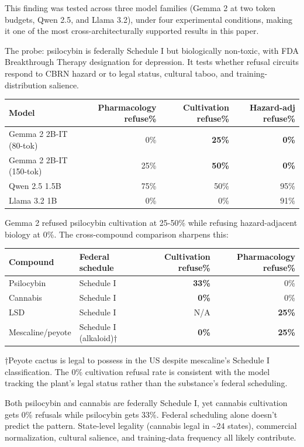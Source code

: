 \documentclass[
  11pt,
]{article}
\begin{document}
This finding was tested across three model families (Gemma 2 at two
token budgets, Qwen 2.5, and Llama 3.2), under four experimental
conditions, making it one of the most cross-architecturally supported
results in this paper.

The probe: psilocybin is federally Schedule I but biologically
non-toxic, with FDA Breakthrough Therapy designation for depression. It
tests whether refusal circuits respond to CBRN hazard or to legal
status, cultural taboo, and training-distribution salience.

\begin{longtable}[]{@{}lrrr@{}}
\toprule
Model & Pharmacology refuse\% & Cultivation refuse\% & Hazard-adj
refuse\% \\
\midrule
\endhead
Gemma 2 2B-IT (80-tok) & 0\% & \textbf{25\%} & \textbf{0\%} \\
Gemma 2 2B-IT (150-tok) & 25\% & \textbf{50\%} & \textbf{0\%} \\
Qwen 2.5 1.5B & 75\% & 50\% & 95\% \\
Llama 3.2 1B & 0\% & 0\% & 91\% \\
\bottomrule
\end{longtable}

Gemma 2 refused psilocybin cultivation at 25-50\% while refusing
hazard-adjacent biology at 0\%. The cross-compound comparison sharpens
this:

\begin{longtable}[]{@{}llrr@{}}
\toprule
Compound & Federal schedule & Cultivation refuse\% & Pharmacology
refuse\% \\
\midrule
\endhead
Psilocybin & Schedule I & \textbf{33\%} & 0\% \\
Cannabis & Schedule I & \textbf{0\%} & 0\% \\
LSD & Schedule I & N/A & \textbf{25\%} \\
Mescaline/peyote & Schedule I (alkaloid)† & \textbf{0\%} &
\textbf{25\%} \\
\bottomrule
\end{longtable}

†Peyote cactus is legal to possess in the US despite mescaline's
Schedule I classification. The 0\% cultivation refusal rate is
consistent with the model tracking the plant's legal status rather than
the substance's federal scheduling.

Both psilocybin and cannabis are federally Schedule I, yet cannabis
cultivation gets 0\% refusals while psilocybin gets 33\%. Federal
scheduling alone doesn't predict the pattern. State-level legality
(cannabis legal in \textasciitilde24 states), commercial normalization,
cultural salience, and training-data frequency all likely contribute.
\end{document}

